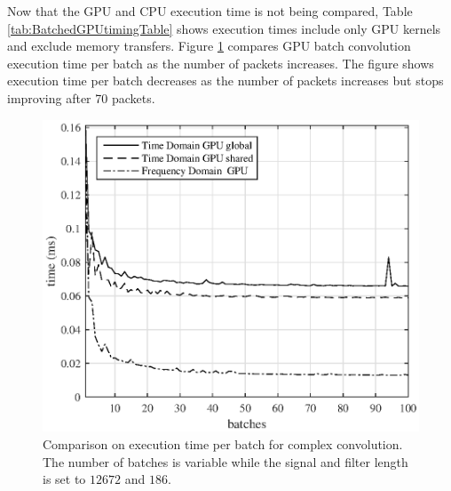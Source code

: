 Now that the GPU and CPU execution time is not being compared, Table \ref{tab:BatchedGPUtimingTable} shows execution times include only GPU kernels and exclude memory transfers.
%
Figure \ref{fig:CPUvsGPU_varyBatches_186taps_12672signal_timePerBatch} compares GPU batch convolution execution time per batch as the number of packets increases.
The figure shows execution time per batch decreases as the number of packets increases but stops improving after 70 packets.
\begin{figure}
	\centering\includegraphics[width=5in]{figures/gpu_intro/CPUvsGPU_varyBatches_186taps_12672signal_timePerBatch.eps}
	\caption{Comparison on execution time per batch for complex convolution. The number of batches is variable while the signal and filter length is set to $12672$ and $186$.}
	\label{fig:CPUvsGPU_varyBatches_186taps_12672signal_timePerBatch}
\end{figure}


